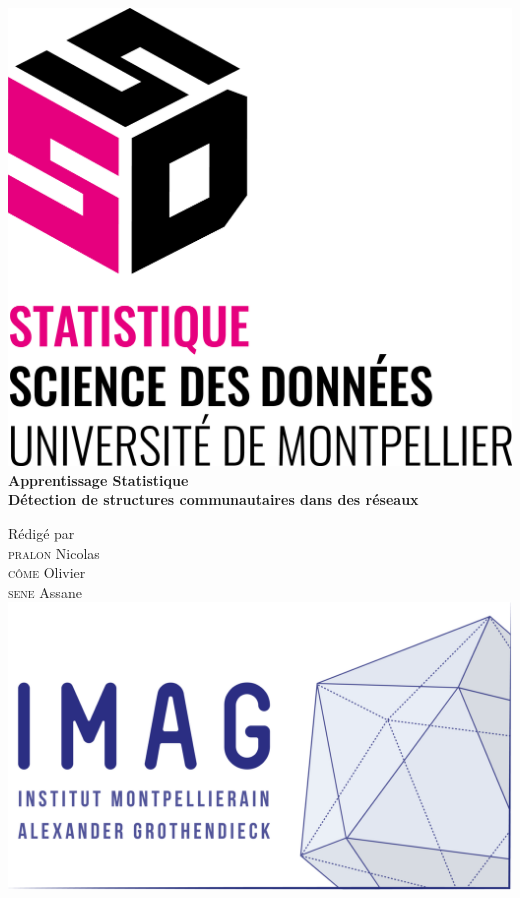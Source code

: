 \documentclass[frenchb]{report}
\newcommand{\1}{\mathbbm{1}}
\theoremstyle{definition}\newtheorem{defn}{Définition}
\theoremstyle{definition}\newtheorem{exm}{Exemple}
\theoremstyle{definition}\newtheorem{nota}{Notation}
\theoremstyle{definition}\newtheorem{rem}{Remarque}
\begin{document}
\begin{titlepage}
\begin{center}
\includegraphics[scale=0.30]{images/ssd.png}\\[3cm]
\linespread{1.2}\huge {\bfseries Apprentissage Statistique }\\[0.5cm]
\linespread{1.2}\LARGE {\bfseries Détection de structures communautaires dans des réseaux}\\[1.5cm]
\linespread{1}

{\large Rédigé par\\}
{\Large \textsc{pralon} Nicolas}\\
{\Large \textsc{côme} Olivier}\\
{\Large \textsc{sene} Assane}\\[1cm]

\includegraphics[scale=0.7]{imag_logo.png}

\end{center}
\end{titlepage}
\tableofcontents
\newpage
\end{document}
